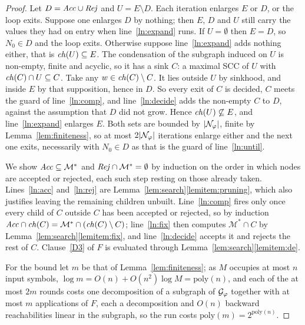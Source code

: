 \begin{proof}
Let $D=\mathit{Acc}\cup\mathit{Rej}$ and $U=E\setminus D$. Each iteration enlarges $E$ or $D$, or the loop exits.
Suppose one enlarges $D$ by nothing; then $E$, $D$ and $U$ still carry the values they had on
entry when line~\ref{ln:expand} runs. If $U=\emptyset$ then $E=D$, so $N_0\in D$ and the loop
exits. Otherwise suppose line~\ref{ln:expand} adds nothing either, that is $\mathit{ch}(U)\subseteq E$.
The condensation of the subgraph induced on $U$ is non-empty, finite and acyclic, so it has a sink
$C$: a maximal SCC of $U$ with $\mathit{ch}(C)\cap U\subseteq C$. Take any $w\in\mathit{ch}(C)\setminus C$. It
lies outside $U$ by sinkhood, and inside $E$ by that supposition, hence in $D$. So every exit of
$C$ is decided, $C$ meets the guard of line~\ref{ln:comp}, and line~\ref{ln:decide} adds the
non-empty $C$ to $D$, against the assumption that $D$ did not grow. Hence
$\mathit{ch}(U)\not\subseteq E$, and line~\ref{ln:expand} enlarges $E$. Both sets are bounded by $|\mathcal{N}_{\varphi}|$, finite by Lemma~\ref{lem:finiteness}, so at most
$2|\mathcal{N}_{\varphi}|$ iterations enlarge either and the next one exits, necessarily with $N_0\in D$ as
that is the guard of line~\ref{ln:until}.



We show $\mathit{Acc}\subseteq\mathcal M^{*}$ and $\mathit{Rej}\cap\mathcal M^{*}=\emptyset$ by induction on the
order in which nodes are accepted or rejected, each such step resting on those already taken.
Lines~\ref{ln:acc} and~\ref{ln:rej} are Lemma~\ref{lem:search}\ref{lemitem:pruning}, which also
justifies leaving the remaining children unbuilt. Line~\ref{ln:comp} fires only once every child
of $C$ outside $C$ has been accepted or rejected, so by induction
$\mathit{Acc}\cap\mathit{ch}(C)=\mathcal M^{*}\cap(\mathit{ch}(C)\setminus C)$; line~\ref{ln:fix} then computes
$\mathcal M^{*}\cap C$ by Lemma~\ref{lem:search}\ref{lemitem:fix}, and line~\ref{ln:decide}
accepts it and rejects the rest of $C$. Clause~\ref{D3} of $F$ is evaluated through
Lemma~\ref{lem:search}\ref{lemitem:de}.

For the bound let $m$ be that of Lemma~\ref{lem:finiteness}; as $M$
occupies at most $n$ input symbols, $\log m=O(n)+O(n^{2})\log M=\mathrm{poly}(n)$, and each of the at
most $2m$ rounds costs one decomposition of a subgraph of $\mathcal{G}_{\varphi}$ together with at most $m$
applications of $F$, each a decomposition and $O(n)$ backward reachabilities linear in the subgraph,
so the run costs $\mathrm{poly}(m)=2^{\mathrm{poly}(n)}$.
\end{proof}




